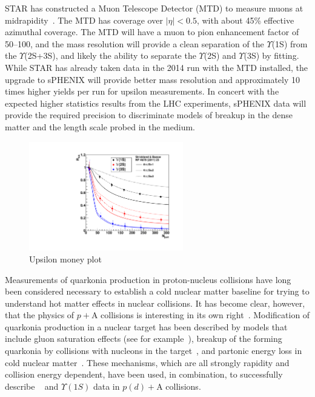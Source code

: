 STAR has constructed a Muon Telescope Detector (MTD) to measure muons
at midrapidity~\cite{Ruan:2009ug}. The MTD 
has coverage over $|\eta| < 0.5$, with about 45\% effective
azimuthal coverage. The MTD will have a muon to pion enhancement
factor of 50--100, and the mass resolution will provide a clean
separation of the $\Upsilon$(1S) from the $\Upsilon$(2S+3S), and
likely the ability to separate the $\Upsilon$(2S) and $\Upsilon$(3S)
by fitting. While STAR has already taken data in the 2014 run with the MTD
installed, the upgrade to sPHENIX will provide better mass
resolution and approximately 10 times higher yields per run for
upsilon measurements.   In concert with the expected higher statistics results 
from the LHC experiments, sPHENIX data will provide the required precision to
discriminate models of breakup in the dense matter and the length scale
probed in the medium.

\begin{figure}
  \begin{center}
    \includegraphics[width=0.6\textwidth]{figs/upsilon_raa_10pc_bins_100Bevts}
  \end{center}
  \caption{Upsilon money plot}
\end{figure}



Measurements of quarkonia production in proton-nucleus collisions have
long been considered necessary to establish a cold nuclear matter
baseline for trying to understand hot matter effects in nuclear
collisions. It has become clear, however, that the physics of $p+$A
collisions is interesting in its own
right~\cite{Brambilla:2010cs}. Modification of quarkonia production in
a nuclear target has been described by models that include gluon
saturation effects (see for example~\cite{Eskola:2009uj}), breakup of
the forming quarkonia by collisions with nucleons in the
target~\cite{Arleo:1999af,McGlinchey:2012bp}, and partonic energy loss
in cold nuclear matter~\cite{Arleo:2012rs}.  These mechanisms, which
are all strongly rapidity and collision energy dependent, have been
used, in combination, to successfully describe \jpsi~ and
$\Upsilon(1S)$ data in $p(d)+$A collisions.

